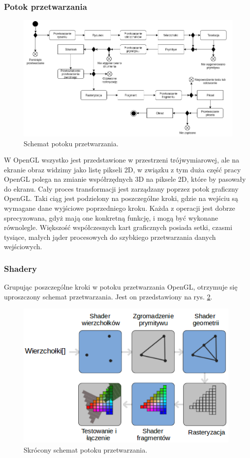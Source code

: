 \subsubsection{Potok przetwarzania}
\begin{figure}[H]
		\centering
 		\includegraphics[width=15.5cm]{OpenGL.png}
    	\caption{Schemat potoku przetwarzania.}
 		\label{rys7}
\end{figure}
W OpenGL wszystko jest przedstawione w przestrzeni trójwymiarowej, ale na ekranie obraz widzimy jako listę pikseli 2D, w związku z tym duża część pracy OpenGL polega na zmianie współrzędnych 3D na piksele 2D, które by pasowały do ekranu. Cały proces transformacji jest zarządzany poprzez potok graficzny OpenGL. Taki ciąg jest podzielony na poszczególne kroki, gdzie na wejściu są wymagane dane wyjściowe poprzedniego kroku. Każda z operacji jest dobrze sprecyzowana, gdyż mają one konkretną funkcję, i mogą być wykonane równolegle. Większość współczesnych kart graficznych posiada setki, czasmi tysiące, małych jąder procesowych do szybkiego przetwarzania danych wejściowych.

\subsubsection{Shadery}
Grupując poszczególne kroki w potoku przetwarzania OpenGL, otrzymuje się uproszczony schemat przetwarzania. Jest on przedstawiony na rys. \ref{rys8}.
\begin{figure}[H]
		\centering
 		\includegraphics[width=11cm]{pipeline.png}
    	\caption{Skrócony schemat potoku przetwarzania.}
 		\label{rys8}
\end{figure}
 
